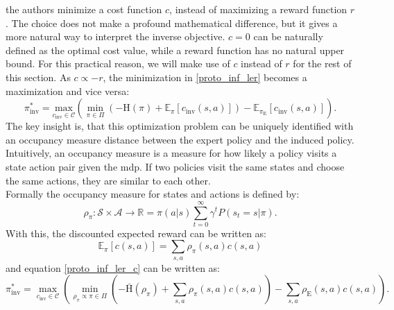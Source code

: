 the authors minimize a cost function $c$, instead of maximizing a reward function $r$. The choice does not make a profound 
mathematical difference, but it gives a more natural way to interpret the inverse objective. $c=0$ can be naturally defined as the optimal cost value, while a reward function has 
no natural upper bound. For this practical reason, we will make use of $c$ instead of $r$ for the rest of this section. As $c \propto -r$, the minimization in 
\ref{proto_inf_ler} becomes a maximization and vice versa:
\begin{equation}
    \label{proto_inf_ler_c}
    \pi_{\text{inv}}^* = \underset{c_{\text{inv}} \in \mathcal{C}}{\text{max}} \left( \min_{\pi \in \Pi} \left(- \text{H}(\pi) + \mathbb{E}_{\pi}[c_{\text{inv}}(s, a)] \right) - \mathbb{E}_{\pi_{\text{E}}}[c_{\text{inv}}(s,a)] \right).
\end{equation}
The key insight is, that this optimization problem can be uniquely identified with an occupancy measure distance between the expert policy and the 
induced policy. Intuitively, an occupancy measure is a measure for how likely a policy visits a state action pair given the \ac{mdp}. If two policies visit the same 
states and choose the same actions, they are similar to each other.\\
Formally the occupancy measure for states and actions is defined by: 
\begin{equation*}
    \rho_{\pi}:\mathcal{S} \times \mathcal{A} \rightarrow \mathbb{R} = \pi(a|s)\sum_{t=0}^\infty \gamma^tP(s_t=s|\pi).
\end{equation*}
With this, the discounted expected reward can be written as:
\begin{equation}
    \mathbb{E}_\pi[c(s,a)] = \sum_{s,a} \rho_\pi(s,a) c(s,a)
\end{equation}
and equation \ref{proto_inf_ler_c} can be written as:
\begin{equation}
    \label{occ_meas_obj}
    \pi_{\text{inv}}^* = \max_{c_{\text{inv}} \in \mathcal{C}} \left( \min_{\rho_\pi \propto \pi \in \Pi} \left(- \bar{\text{H}}(\rho_\pi) + \sum_{s,a} \rho_\pi(s,a) c(s,a) \right) - \sum_{s,a} \rho_{\text{E}}(s,a) c(s,a) \right).
\end{equation}

